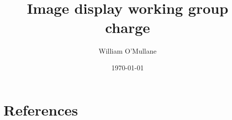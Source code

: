 \documentclass[DM,lsstdraft,toc]{lsstdoc}
\title{	Image display working group charge}
\author{%
William O'Mullane
}
\date{\today}
\begin{document}
\maketitle





\appendix
\section{References } \label{sec:bib}
\renewcommand{\refname}{}


\printglossaries
\end{document}
